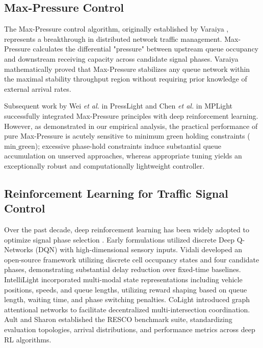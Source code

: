 \documentclass{ieeeaccess}
\begin{document}
\subsection{Max-Pressure Control}
The Max-Pressure control algorithm, originally established by Varaiya \cite{varaiya2013max}, represents a breakthrough in distributed network traffic management. Max-Pressure calculates the differential "pressure" between upstream queue occupancy and downstream receiving capacity across candidate signal phases. Varaiya mathematically proved that Max-Pressure stabilizes any queue network within the maximal stability throughput region without requiring prior knowledge of external arrival rates. 

Subsequent work by Wei \emph{et al.} in PressLight \cite{wei2019presslight} and Chen \emph{et al.} in MPLight \cite{chen2020toward} successfully integrated Max-Pressure principles with deep reinforcement learning. However, as demonstrated in our empirical analysis, the practical performance of pure Max-Pressure is acutely sensitive to minimum green holding constraints ($\text{min\_green}$); excessive phase-hold constraints induce substantial queue accumulation on unserved approaches, whereas appropriate tuning yields an exceptionally robust and computationally lightweight controller.

\subsection{Reinforcement Learning for Traffic Signal Control}
Over the past decade, deep reinforcement learning has been widely adopted to optimize signal phase selection \cite{mnih2015human, wei2018intellilight, ault2021reinforcement}. Early formulations utilized discrete Deep Q-Networks (DQN) with high-dimensional sensory inputs. Vidali \cite{vidali2020deeprl} developed an open-source framework utilizing discrete cell occupancy states and four candidate phases, demonstrating substantial delay reduction over fixed-time baselines. IntelliLight \cite{wei2018intellilight} incorporated multi-modal state representations including vehicle positions, speeds, and queue lengths, utilizing reward shaping based on queue length, waiting time, and phase switching penalties. CoLight \cite{wei2019colight} introduced graph attentional networks to facilitate decentralized multi-intersection coordination. Ault and Sharon \cite{ault2021reinforcement} established the RESCO benchmark suite, standardizing evaluation topologies, arrival distributions, and performance metrics across deep RL algorithms.
\end{document}
